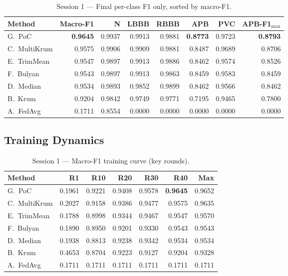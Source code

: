 \documentclass[11pt,a4paper]{article}
\begin{document}
\begin{table}[H]
\centering
\caption{Session 1 --- Final per-class F1 only, sorted by macro-F1.}
\label{tab:s1_f1}
\begin{tabular}{@{}l r rrrrr r@{}}
\toprule
\textbf{Method} & \textbf{Macro-F1} & \textbf{N} & \textbf{LBBB} & \textbf{RBBB} & \textbf{APB} & \textbf{PVC} & \textbf{APB-F1$_{\max}$} \\
\midrule
G.\ PoC       & \textbf{0.9645} & 0.9937 & 0.9913 & 0.9881 & \textbf{0.8773} & 0.9723 & \textbf{0.8793} \\
C.\ MultiKrum & 0.9575 & 0.9906 & 0.9909 & 0.9881 & 0.8487 & 0.9689 & 0.8706 \\
E.\ TrimMean  & 0.9547 & 0.9897 & 0.9913 & 0.9886 & 0.8462 & 0.9574 & 0.8526 \\
F.\ Bulyan    & 0.9543 & 0.9897 & 0.9913 & 0.9863 & 0.8459 & 0.9583 & 0.8459 \\
D.\ Median    & 0.9534 & 0.9893 & 0.9852 & 0.9899 & 0.8462 & 0.9566 & 0.8462 \\
B.\ Krum      & 0.9204 & 0.9842 & 0.9749 & 0.9771 & 0.7195 & 0.9465 & 0.7800 \\
\rowcolor{softred}
A.\ FedAvg    & 0.1711 & 0.8554 & 0.0000 & 0.0000 & 0.0000 & 0.0000 & 0.0000 \\
\bottomrule
\end{tabular}
\end{table}

\subsection{Training Dynamics}

\begin{table}[H]
\centering
\caption{Session 1 --- Macro-F1 training curve (key rounds).}
\label{tab:s1_curve}
\begin{tabular}{@{}l rrrrrr@{}}
\toprule
\textbf{Method} & \textbf{R1} & \textbf{R10} & \textbf{R20} & \textbf{R30} & \textbf{R40} & \textbf{Max} \\
\midrule
G.\ PoC       & 0.1961 & 0.9221 & 0.9408 & 0.9578 & \textbf{0.9645} & 0.9652 \\
C.\ MultiKrum & 0.2027 & 0.9158 & 0.9386 & 0.9477 & 0.9575 & 0.9635 \\
E.\ TrimMean  & 0.1788 & 0.8998 & 0.9344 & 0.9467 & 0.9547 & 0.9570 \\
F.\ Bulyan    & 0.1890 & 0.8950 & 0.9201 & 0.9330 & 0.9543 & 0.9543 \\
D.\ Median    & 0.1938 & 0.8813 & 0.9238 & 0.9342 & 0.9534 & 0.9534 \\
B.\ Krum      & 0.4653 & 0.8704 & 0.9223 & 0.9127 & 0.9204 & 0.9328 \\
\rowcolor{softred}
A.\ FedAvg    & 0.1711 & 0.1711 & 0.1711 & 0.1711 & 0.1711 & 0.1711 \\
\bottomrule
\end{tabular}
\end{table}
\end{document}
